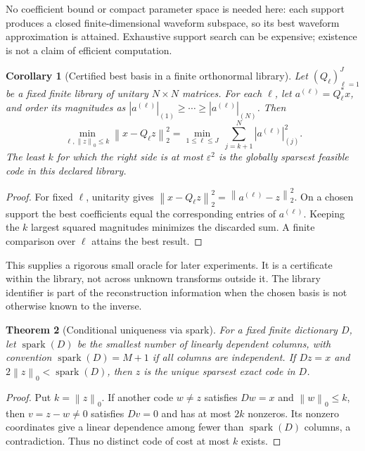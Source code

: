 \documentclass[11pt,a4paper]{article}
\newtheorem{theorem}{Theorem}
\newtheorem{corollary}[theorem]{Corollary}
\theoremstyle{definition}
\theoremstyle{remark}
\newcommand{\spark}{\operatorname{spark}}
\newcommand{\norm}[1]{\left\lVert#1\right\rVert}
\begin{document}
No coefficient bound or compact parameter space is needed here: each support
produces a closed finite-dimensional waveform subspace, so its best waveform
approximation is attained. Exhaustive support search can be expensive; existence
is not a claim of efficient computation.

\begin{corollary}[Certified best basis in a finite orthonormal library]\label{cor:library}
Let $(Q_\ell)_{\ell=1}^J$ be a fixed finite library of unitary $N\times N$
matrices. For each $\ell$, let $a^{(\ell)}=Q_\ell^*x$, and order its magnitudes as
$|a^{(\ell)}|_{(1)}\geq\cdots\geq|a^{(\ell)}|_{(N)}$. Then
\[
\min_{\ell,\norm{z}_0\leq k}\norm{x-Q_\ell z}_2^2
=\min_{1\leq\ell\leq J}\ \sum_{j=k+1}^N|a^{(\ell)}|_{(j)}^2.
\]
The least $k$ for which the right side is at most $\varepsilon^2$ is the
globally sparsest feasible code in this declared library.
\end{corollary}
\begin{proof}
For fixed $\ell$, unitarity gives
$\norm{x-Q_\ell z}_2^2=\norm{a^{(\ell)}-z}_2^2$. On a chosen support the best
coefficients equal the corresponding entries of $a^{(\ell)}$. Keeping the
$k$ largest squared magnitudes minimizes the discarded sum. A finite comparison
over $\ell$ attains the best result.
\end{proof}

This supplies a rigorous small oracle for later experiments. It is a certificate
within the library, not across unknown transforms outside it. The library
identifier is part of the reconstruction information when the chosen basis is
not otherwise known to the inverse.

\begin{theorem}[Conditional uniqueness via spark]\label{thm:spark}
For a fixed finite dictionary $D$, let $\spark(D)$ be the smallest number of
linearly dependent columns, with convention $\spark(D)=M+1$ if all columns are
independent. If $Dz=x$ and
$2\norm{z}_0<\spark(D)$, then $z$ is the unique sparsest exact code in $D$.
\end{theorem}
\begin{proof}
Put $k=\norm{z}_0$. If another code $w\neq z$ satisfies $Dw=x$ and
$\norm{w}_0\leq k$, then $v=z-w\neq0$ satisfies $Dv=0$ and has at most $2k$
nonzeros. Its nonzero coordinates give a linear dependence among fewer than
$\spark(D)$ columns, a contradiction. Thus no distinct code of cost at most
$k$ exists.
\end{proof}
\end{document}
